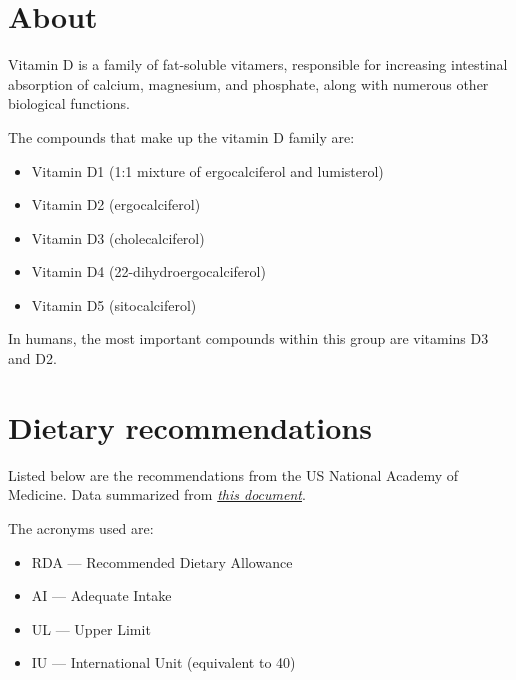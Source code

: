 \documentclass{book}
\begin{document}
\begin{sloppypar}
\section{About}
Vitamin D is a family of fat-soluble vitamers, responsible for increasing intestinal absorption of calcium, magnesium, and phosphate, along with numerous other biological functions.

The compounds that make up the vitamin D family are:
\begin{itemize}
	\item Vitamin D1 (1:1 mixture of ergocalciferol and lumisterol)
	\item Vitamin D2 (ergocalciferol)
	\item Vitamin D3 (cholecalciferol)
	\item Vitamin D4 (22-dihydroergocalciferol)
	\item Vitamin D5 (sitocalciferol)
\end{itemize}

In humans, the most important compounds within this group are vitamins D3 and D2.

\section{Dietary recommendations}
Listed below are the recommendations from the US National Academy of Medicine. Data summarized from \href{https://nap.nationalacademies.org/read/13050/chapter/7}{\textit{this document}}.

The acronyms used are:
\begin{itemize}
	\item RDA --- Recommended Dietary Allowance
	\item AI --- Adequate Intake
	\item UL --- Upper Limit
	\item IU --- International Unit (equivalent to 40)
\end{itemize}


\end{sloppypar}
\end{document}
